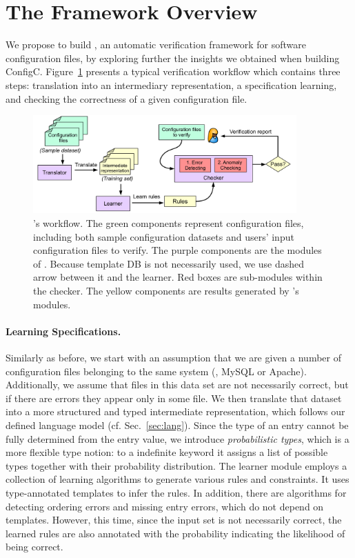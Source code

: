 
\section{The \app Framework Overview}
\label{sec:overview}

We propose to build \app, an automatic verification framework for 
software configuration files, by exploring further the insights we 
obtained when building ConfigC. Figure~\ref{fig-overview} presents
a typical \app verification workflow which contains three steps:
translation into an intermediary representation, a specification 
learning, and checking the correctness of a given configuration file. 

\begin{figure}[htbp] \centering
\includegraphics[width=0.9\textwidth]{figs/overview}
\caption{\app's workflow. The green components represent configuration 
  files, including both sample configuration datasets and users' input
  configuration files to verify. 
  The purple components are the modules of \app.
  Because template DB is not necessarily used, we use dashed
  arrow between it and the learner.
  Red boxes are sub-modules within the checker.
  The yellow components are results generated by \app's modules.}
\label{fig-overview}
\end{figure}

\paragraph{Learning Specifications.}
Similarly as before, we start with an assumption 
that we are given a number of 
configuration files belonging to the same system (\eg, MySQL or Apache).
Additionally, we assume that files in this data set are 
not necessarily correct, but if there are errors they appear only in some
file. We then translate that dataset into a more structured
and typed intermediate representation, which follows
our defined language model (cf. Sec.~\ref{sec:lang}).
Since the type of an entry cannot be fully determined from 
the entry value, we introduce {\em probabilistic types}, which is
a more flexible type notion: to a indefinite keyword it 
assigns a list of possible types together with their probability 
distribution. The learner module employs a collection of learning
 algorithms to generate various rules and constraints.
It uses type-annotated templates to infer the rules. In addition, 
there are algorithms for detecting ordering errors and missing entry
errors, which do not depend on templates. However, this time, 
since the input set is not necessarily correct, the learned rules are
also annotated with the probability indicating the likelihood of being 
correct. 
 
